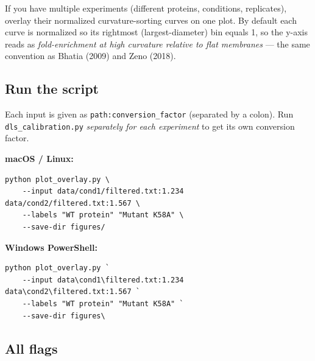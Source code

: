\documentclass[11pt]{article}
\newcommand{\code}[1]{\texttt{#1}}
\begin{document}
If you have multiple experiments (different proteins, conditions,
replicates), overlay their normalized curvature-sorting curves on
one plot. By default each curve is normalized so its rightmost
(largest-diameter) bin equals 1, so the y-axis reads as
\emph{fold-enrichment at high curvature relative to flat membranes}
--- the same convention as Bhatia (2009) and Zeno (2018).

\subsection*{Run the script}

Each input is given as \code{path:conversion\_factor} (separated by
a colon). Run \code{dls\_calibration.py} \emph{separately for each
experiment} to get its own conversion factor.

\textbf{macOS / Linux:}

\begin{lstlisting}
python plot_overlay.py \
    --input data/cond1/filtered.txt:1.234 data/cond2/filtered.txt:1.567 \
    --labels "WT protein" "Mutant K58A" \
    --save-dir figures/
\end{lstlisting}

\textbf{Windows PowerShell:}

\begin{lstlisting}
python plot_overlay.py `
    --input data\cond1\filtered.txt:1.234 data\cond2\filtered.txt:1.567 `
    --labels "WT protein" "Mutant K58A" `
    --save-dir figures\
\end{lstlisting}

\subsection*{All flags}
\end{document}
